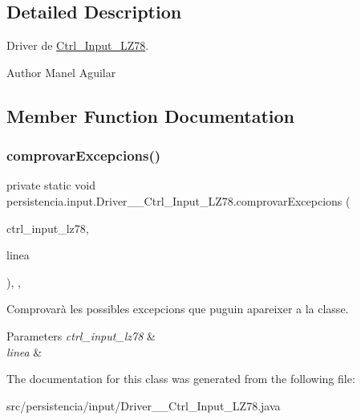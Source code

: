 \subsection{Detailed Description}
Driver de \hyperlink{classpersistencia_1_1input_1_1Ctrl__Input__LZ78}{Ctrl\+\_\+\+Input\+\_\+\+L\+Z78}. 

\begin{DoxyAuthor}{Author}
Manel Aguilar 
\end{DoxyAuthor}


\subsection{Member Function Documentation}
\mbox{\label{classpersistencia_1_1input_1_1Driver____Ctrl__Input__LZ78_a285493e74dff1f6b2520f010f75b850c}} 
\subsubsection{\texorpdfstring{comprovar\+Excepcions()}{comprovarExcepcions()}}
{\footnotesize\ttfamily private static void persistencia.\+input.\+Driver\+\_\+\+\_\+\+Ctrl\+\_\+\+Input\+\_\+\+L\+Z78.\+comprovar\+Excepcions (\begin{DoxyParamCaption}\item[{\hyperlink{classpersistencia_1_1input_1_1Ctrl__Input__LZ78}{Ctrl\+\_\+\+Input\+\_\+\+L\+Z78}}]{ctrl\+\_\+input\+\_\+lz78,  }\item[{String}]{linea }\end{DoxyParamCaption})\hspace{0.3cm}{\ttfamily [inline]}, {\ttfamily [static]}, {\ttfamily [private]}}



Comprovarà les possibles excepcions que puguin apareixer a la classe. 


\begin{DoxyParams}{Parameters}
{\em ctrl\+\_\+input\+\_\+lz78} & \\
\hline
{\em linea} & \\
\hline
\end{DoxyParams}


The documentation for this class was generated from the following file\+:\begin{DoxyCompactItemize}
\item 
src/persistencia/input/Driver\+\_\+\+\_\+\+Ctrl\+\_\+\+Input\+\_\+\+L\+Z78.\+java\end{DoxyCompactItemize}
